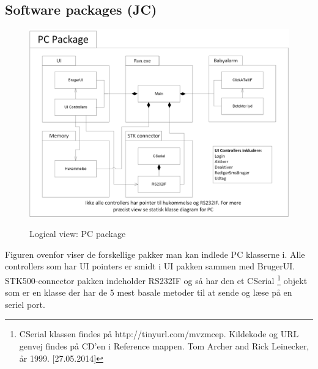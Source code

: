 \clearpage

\subsection{Software packages (JC)}

\begin{figure}[!htb]
     {\includegraphics[width=\textwidth]{billeder/uml/logical_view_pc}}
     \caption{Logical view: PC package}
\end{figure}

Figuren ovenfor viser de forskellige pakker man kan indlede PC klasserne i. Alle controllers som har UI pointers er smidt i UI pakken sammen med BrugerUI. STK500-connector pakken indeholder RS232IF og så har den et CSerial \footnote{CSerial klassen findes på http://tinyurl.com/mvzmcep. Kildekode og URL genvej findes på CD'en i Reference mappen. Tom Archer and Rick Leinecker, år 1999. [27.05.2014] } objekt som er en klasse der har de 5 mest basale metoder til at sende og læse på en seriel port.


\clearpage

